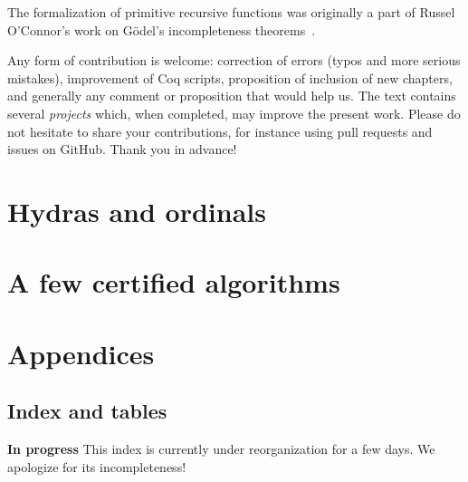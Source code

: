 \documentclass[a4paper]{book}
\begin{document}
The formalization of primitive recursive functions was originally a part of  Russel O'Connor's work on G\"odel's incompleteness theorems~\cite{OConnor05}. 

\label{sec:orgheadline2}

Any form of contribution  is welcome: correction of errors (typos and more serious mistakes), improvement of
Coq scripts, proposition of inclusion of new chapters, and generally any
comment or proposition that would help us. The text contains several \emph{projects} which, when completed, may improve the present work.
Please do not hesitate to share your contributions, for instance using pull requests and issues on GitHub. Thank you in advance!






\part{Hydras and ordinals}



\part{A few  certified algorithms}



\part{Appendices}








\chapter{Index and tables}

{\Large \textbf{In progress} This index is currently under reorganization for a few days. We apologize for its incompleteness! }

\end{document}

